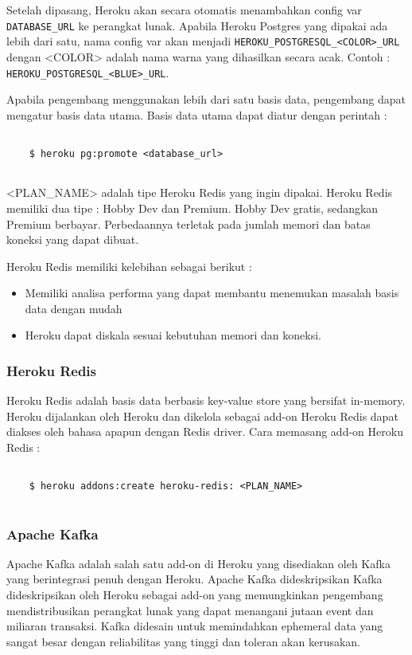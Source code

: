 Setelah dipasang, Heroku akan secara otomatis menambahkan config var \texttt{DATABASE\_URL} ke perangkat lunak. Apabila Heroku Postgres yang dipakai ada lebih dari satu, nama config var akan menjadi \texttt{HEROKU\_POSTGRESQL\_<COLOR>\_URL} dengan <COLOR> adalah nama warna yang dihasilkan secara acak. Contoh : \texttt{HEROKU\_POSTGRESQL\_<BLUE>\_URL}.

Apabila pengembang menggunakan lebih dari satu basis data, pengembang dapat mengatur basis data utama. Basis data utama dapat diatur dengan perintah :
\begin{lstlisting}
	
	$ heroku pg:promote <database_url>
	
\end{lstlisting}
<PLAN\_NAME> adalah tipe Heroku Redis yang ingin dipakai. Heroku Redis memiliki dua tipe : Hobby Dev dan Premium. Hobby Dev gratis, sedangkan Premium berbayar. Perbedaannya terletak pada jumlah memori dan batas koneksi yang dapat dibuat.

Heroku Redis memiliki kelebihan sebagai berikut :
\begin{itemize}
\item Memiliki analisa performa yang dapat membantu menemukan masalah basis data dengan mudah
\item Heroku dapat diskala sesuai kebutuhan memori dan koneksi.
\end{itemize}



\subsubsection{Heroku Redis}
Heroku Redis adalah basis data berbasis key-value store yang bersifat in-memory. Heroku dijalankan oleh Heroku dan dikelola sebagai add-on Heroku Redis dapat diakses oleh bahasa apapun dengan Redis driver. Cara memasang add-on Heroku Redis :
\begin{lstlisting}
	
	$ heroku addons:create heroku-redis: <PLAN_NAME>
	
\end{lstlisting}

\subsubsection{Apache Kafka}
Apache Kafka adalah salah satu add-on di Heroku yang disediakan oleh Kafka yang berintegrasi penuh dengan Heroku. Apache Kafka dideskripsikan Kafka dideskripsikan oleh Heroku sebagai add-on yang memungkinkan pengembang mendistribusikan perangkat lunak yang dapat menangani jutaan event dan miliaran transaksi. Kafka didesain untuk memindahkan ephemeral data yang sangat besar dengan reliabilitas yang tinggi dan toleran akan kerusakan.


